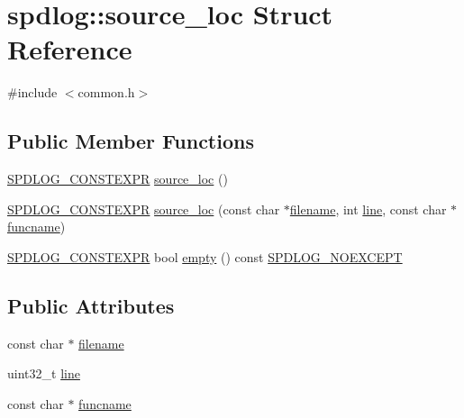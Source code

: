 \hypertarget{structspdlog_1_1source__loc}{}\section{spdlog\+:\+:source\+\_\+loc Struct Reference}
\label{structspdlog_1_1source__loc}


{\ttfamily \#include $<$common.\+h$>$}

\subsection*{Public Member Functions}
\begin{DoxyCompactItemize}
\item 
\hyperlink{common_8h_a8747e6feba8bf2d3f204cb76bfd4607a}{S\+P\+D\+L\+O\+G\+\_\+\+C\+O\+N\+S\+T\+E\+X\+PR} \hyperlink{structspdlog_1_1source__loc_a342ef1c40ab4d15356f60fd214c38044}{source\+\_\+loc} ()
\item 
\hyperlink{common_8h_a8747e6feba8bf2d3f204cb76bfd4607a}{S\+P\+D\+L\+O\+G\+\_\+\+C\+O\+N\+S\+T\+E\+X\+PR} \hyperlink{structspdlog_1_1source__loc_a162cee7b0c3236e0baa0e7d7d8a4cb7b}{source\+\_\+loc} (const char $\ast$\hyperlink{structspdlog_1_1source__loc_af67920703a5ba0a5557eb86667e09c80}{filename}, int \hyperlink{structspdlog_1_1source__loc_a1742569c23cc7e3a01fa6de6f43cc60f}{line}, const char $\ast$\hyperlink{structspdlog_1_1source__loc_a622d48d070d0421ec91a6484923aacd2}{funcname})
\item 
\hyperlink{common_8h_a8747e6feba8bf2d3f204cb76bfd4607a}{S\+P\+D\+L\+O\+G\+\_\+\+C\+O\+N\+S\+T\+E\+X\+PR} bool \hyperlink{structspdlog_1_1source__loc_a87cedeee3cb80521f33c3cf86651ae96}{empty} () const \hyperlink{common_8h_a15d2dc432e6bb83beb5130be9a4ca8d6}{S\+P\+D\+L\+O\+G\+\_\+\+N\+O\+E\+X\+C\+E\+PT}
\end{DoxyCompactItemize}
\subsection*{Public Attributes}
\begin{DoxyCompactItemize}
\item 
const char $\ast$ \hyperlink{structspdlog_1_1source__loc_af67920703a5ba0a5557eb86667e09c80}{filename}
\item 
uint32\+\_\+t \hyperlink{structspdlog_1_1source__loc_a1742569c23cc7e3a01fa6de6f43cc60f}{line}
\item 
const char $\ast$ \hyperlink{structspdlog_1_1source__loc_a622d48d070d0421ec91a6484923aacd2}{funcname}
\end{DoxyCompactItemize}


